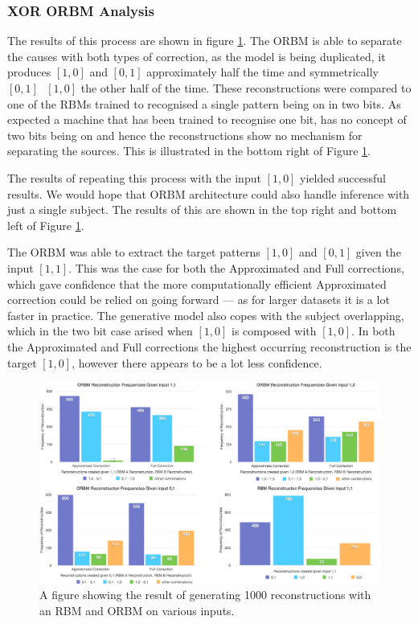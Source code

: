 \subsubsection{XOR ORBM Analysis}

The results of this process are shown in figure \ref{F:Two-Bit-RBM-Inference-Results-1}. The ORBM is able to separate the causes with both types of correction, as the model is being duplicated, it produces $[1,0]$ and $[0,1]$ approximately half the time and symmetrically $[0,1]\text{ }[1,0]$ the other half of the time. These reconstructions were compared to one of the RBMs trained to recognised a single pattern being on in two bits. As expected a machine that has been trained to recognise one bit, has no concept of two bits being on and hence the reconstructions show no mechanism for separating the sources. This is illustrated in the bottom right of Figure \ref{F:Two-Bit-RBM-Inference-Results-1}.

The results of repeating this process with the input $[1,0]$ yielded successful results. We would hope that ORBM architecture could also handle inference with just a single subject. The results of this are shown in the top right and bottom left of Figure \ref{F:Two-Bit-RBM-Inference-Results-1}.

The ORBM was able to extract the target patterns $[1,0]$ and $[0,1]$ given the input $[1,1]$. This was the case for both the Approximated and Full corrections, which gave confidence that the more computationally efficient Approximated correction could be relied on going forward --- as for larger datasets it is a lot faster in practice. The generative model also copes with the subject overlapping, which in the two bit case arised when $[1,0]$ is composed with $[1,0]$. In both the Approximated and Full corrections the highest occurring reconstruction is the target $[1,0]$, however there appears to be a lot less confidence.


\begin{landscape}
\begin{figure}
  \begin{center}
    \includegraphics[height=0.9\textheight]{Assets/results/xor-results}
  \end{center}
  \caption{A figure showing the result of generating 1000 reconstructions with an RBM and ORBM on various inputs.}
  \label{F:Two-Bit-RBM-Inference-Results-1}
\end{figure}
\end{landscape}



